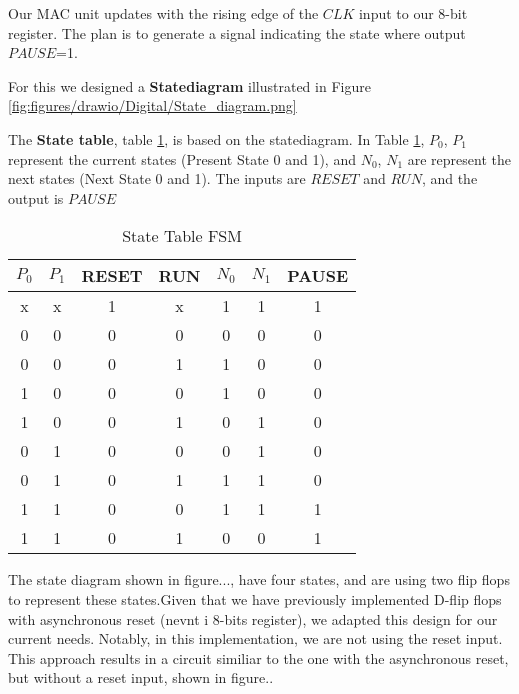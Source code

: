 Our MAC unit updates with the rising edge of the $CLK$ input to our 8-bit register. The plan is to generate a signal indicating the state where output $PAUSE$=1.

For this we designed a \textbf{Statediagram} illustrated in Figure \ref{fig:figures/drawio/Digital/State_diagram.png}


The \textbf{State table}, table \ref{State Table FSM}, is based on the statediagram. In Table \ref{State Table FSM}, $P_{0}$, $P_{1}$ represent the current states (Present State 0 and 1),  and $N_{0}$, $N_{1}$ are represent the next states (Next State 0 and 1). The inputs are $RESET$ and $RUN$, and the output is $PAUSE$

\begin{table}[H]
    \centering
    \caption{State Table FSM}
    \label{State Table FSM}
    \begin{tabular}{|c|c|c|c|c|c|c|}
        \hline
        $P_{0}$ & $P_{1}$ & RESET & RUN & $N_{0}$ & $N_{1}$ & PAUSE \\
        \hline
        x    & x    & 1     & x   & 1    & 1    & 1     \\
        0    & 0    & 0     & 0   & 0    & 0    & 0     \\
        0    & 0    & 0     & 1   & 1    & 0    & 0     \\
        1    & 0    & 0     & 0   & 1    & 0    & 0     \\
        1    & 0    & 0     & 1   & 0    & 1    & 0     \\
        0    & 1    & 0     & 0   & 0    & 1    & 0     \\
        0    & 1    & 0     & 1   & 1    & 1    & 0     \\
        1    & 1    & 0     & 0   & 1    & 1    & 1     \\
        1    & 1    & 0     & 1   & 0    & 0    & 1     \\
        \hline
        
    \end{tabular}
    \end{table}



The state diagram shown in figure..., have four states, and are using two flip flops to represent these states.Given that we have previously implemented D-flip flops with asynchronous reset (nevnt i 8-bits register), we adapted this design for our current needs. Notably, in this implementation, we are not using the reset input. This approach results in a circuit similiar to the one with the asynchronous reset, but without a reset input, shown in figure..

